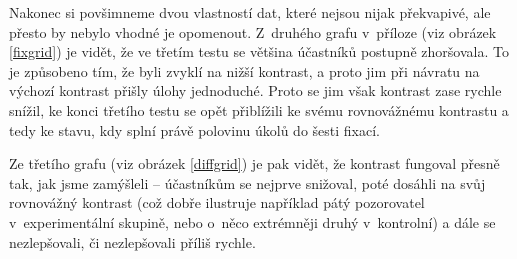 Nakonec si povšimneme dvou vlastností dat, které nejsou nijak překvapivé, ale
přesto by nebylo vhodné je opomenout. Z~druhého grafu v~příloze (viz obrázek \ref{fixgrid}) je vidět, že ve třetím testu se většina účastníků postupně zhoršovala. To je způsobeno tím, že byli zvyklí na nižší kontrast, a proto jim při návratu na výchozí kontrast přišly úlohy jednoduché. Proto se jim však kontrast zase rychle snížil, ke konci třetího testu se opět přiblížili ke svému rovnovážnému kontrastu a tedy ke stavu, kdy splní právě polovinu úkolů do šesti fixací.

Ze třetího grafu (viz obrázek \ref{diffgrid}) je pak vidět, že kontrast fungoval přesně tak, jak jsme zamýšleli -- účastníkům se nejprve snižoval, poté dosáhli na svůj rovnovážný kontrast (což dobře ilustruje například pátý pozorovatel v~experimentální skupině, nebo o~něco extrémněji druhý v~kontrolní) a dále se nezlepšovali, či nezlepšovali příliš rychle. 

